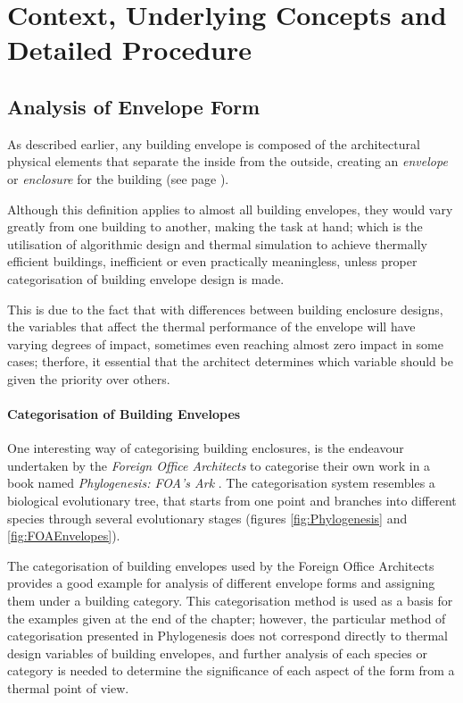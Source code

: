 \section{Context, Underlying Concepts and Detailed Procedure}
\label{sec:DetailedProcedure}

\subsection{Analysis of Envelope Form}
\label{sec:AnalyseEnvelope}

As described earlier, any building envelope is composed of the architectural physical elements that separate the inside from the outside, creating an \emph{envelope} or \emph{enclosure} for the building (see page \pageref{BuildEnvDef}).

Although this definition applies to almost all building envelopes, they would vary greatly from one building to another, making the task at hand; which is the utilisation of algorithmic design and thermal simulation to achieve thermally efficient buildings, inefficient or even practically meaningless, unless proper categorisation of building envelope design is made.

This is due to the fact that with differences between building enclosure designs, the variables that affect the thermal performance of the envelope will have varying degrees of impact, sometimes even reaching almost zero impact in some cases; therfore, it essential that the architect determines which variable should be given the priority over others.

\paragraph{Categorisation of Building Envelopes}\mbox{}

One interesting way of categorising building enclosures, is the endeavour undertaken by the \emph{Foreign Office Architects} to categorise their own work in a book named \emph{Phylogenesis: FOA's Ark} \cite{foa04}. The categorisation system resembles a biological evolutionary tree, that starts from one point and branches into different species through several evolutionary stages (figures \ref{fig:Phylogenesis} and \ref{fig:FOAEnvelopes}).

The categorisation of building envelopes used by the Foreign Office Architects provides a good example for analysis of different envelope forms and assigning them under a building category. This categorisation method is used as a basis for the examples given at the end of the chapter; however, the particular method of categorisation presented in Phylogenesis does not correspond directly to thermal design variables of building envelopes, and further analysis of each species or category is needed to determine the significance of each aspect of the form from a thermal point of view.

